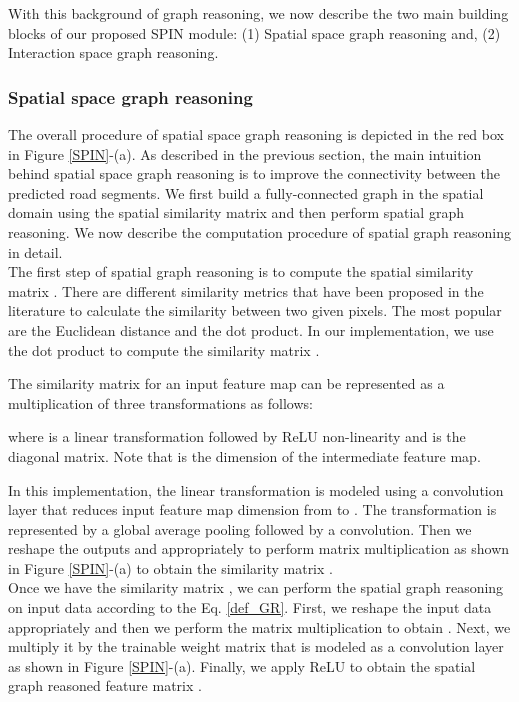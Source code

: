 \documentclass[letterpaper, 10 pt, conference]{ieeeconf}
\begin{document}
With this background of graph reasoning, we now describe the two main building blocks of our proposed SPIN module: (1) Spatial space graph reasoning and, (2) Interaction space graph reasoning.

\subsubsection{Spatial space graph reasoning}
The overall procedure of spatial space graph reasoning is depicted in the red box in Figure \ref{SPIN}-(a). As described in the previous section, the main intuition behind spatial space graph reasoning is to improve the connectivity between the predicted road segments. We first build a fully-connected graph in the spatial domain  using the spatial similarity matrix  and then perform spatial graph reasoning. We now describe the computation procedure of spatial graph reasoning in detail.\\
  The first step of spatial graph reasoning is to compute the spatial similarity matrix . There are different similarity metrics that have been proposed in the literature to calculate the similarity between two given pixels. The most popular are the Euclidean distance and the dot product. In our implementation, we use the dot product to compute the similarity matrix .

The similarity matrix  for an input feature map  can be represented as a multiplication of three transformations as follows:

where  is a linear transformation followed by ReLU non-linearity and  is the diagonal matrix. Note that  is the dimension of the intermediate feature map.

In this implementation, the linear transformation  is modeled using a    convolution layer that reduces input feature map dimension from  to . The transformation  is represented by a global average pooling followed by a  convolution. Then we reshape the outputs  and  appropriately to perform matrix multiplication as shown in Figure \ref{SPIN}-(a) to obtain the similarity matrix .\\
 Once we have the similarity matrix , we can perform the spatial graph reasoning on input data according to the Eq. \eqref{def_GR}. First, we reshape the input data appropriately and then we perform the matrix multiplication to obtain . Next, we multiply it by the trainable weight matrix  that is modeled as a  convolution layer as shown in Figure \ref{SPIN}-(a). Finally, we apply ReLU to obtain the spatial graph reasoned feature matrix .
\end{document}
